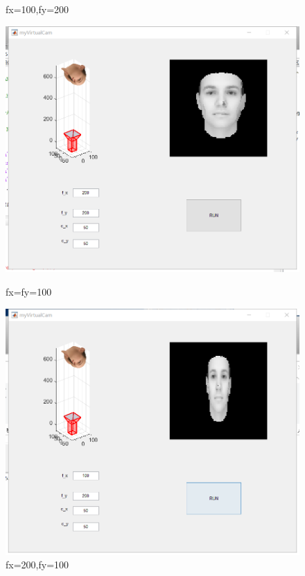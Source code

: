 \documentclass{xcumcmart}
\begin{document}
\begin{figure}[htbp]
\begin{minipage}[htbp]{0.48\linewidth}
	\caption{fx=100,fy=200\label{fig:1255}}
\end{minipage}
\end{figure}
\begin{figure}
\begin{minipage}[htbp]{0.48\linewidth}
    \centering
	\includegraphics[width=1\textwidth]{fig/2255.png}
	\caption{fx=fy=100\label{fig:1155}}
\end{minipage}
\hfill
\begin{minipage}[htbp]{0.48\linewidth}
    \centering
	\includegraphics[width=1\textwidth]{fig/1255.png}
	\caption{fx=200,fy=100\label{fig:2155}}
\end{minipage}
\end{figure}
\end{document}
